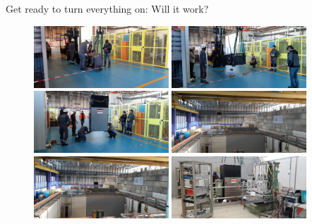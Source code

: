 \documentclass[xcolor = table]{beamer}
\begin{document}
\begin{frame}{Get ready to turn everything on: Will it work?}
  \begin{figure}
    \centering
    \includegraphics[width = 0.45\textwidth]{Plots/TORCH_transport_0.jpg}
    \includegraphics[width = 0.45\textwidth]{Plots/TORCH_transport_1.jpg}
    \includegraphics[width = 0.45\textwidth]{Plots/TORCH_transport_2.jpg}
    \includegraphics[width = 0.45\textwidth]{Plots/TORCH_transport_4.jpg}
    \includegraphics[width = 0.45\textwidth]{Plots/TORCH_transport_5.jpg}
    \includegraphics[width = 0.45\textwidth]{Plots/TORCH_transport_3.jpg}
  \end{figure}
\end{frame}
\end{document}
